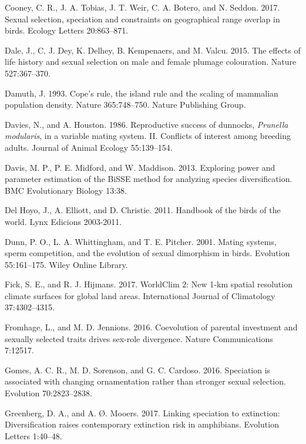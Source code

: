 \documentclass[]{article}
\begin{document}
\leavevmode\hypertarget{ref-Cooney_2017}{}%
Cooney, C. R., J. A. Tobias, J. T. Weir, C. A. Botero, and N. Seddon.
2017. Sexual selection, speciation and constraints on geographical range
overlap in birds. Ecology Letters 20:863--871.

\leavevmode\hypertarget{ref-Dale_2015}{}%
Dale, J., C. J. Dey, K. Delhey, B. Kempenaers, and M. Valcu. 2015. The
effects of life history and sexual selection on male and female plumage
colouration. Nature 527:367--370.

\leavevmode\hypertarget{ref-Damuth_1993}{}%
Damuth, J. 1993. Cope's rule, the island rule and the scaling of
mammalian population density. Nature 365:748--750. Nature Publishing
Group.

\leavevmode\hypertarget{ref-davies1986re}{}%
Davies, N., and A. Houston. 1986. Reproductive success of dunnocks,
\emph{Prunella modularis}, in a variable mating system. II. Conflicts of
interest among breeding adults. Journal of Animal Ecology 55:139--154.

\leavevmode\hypertarget{ref-Davis_2013}{}%
Davis, M. P., P. E. Midford, and W. Maddison. 2013. Exploring power and
parameter estimation of the BiSSE method for analyzing species
diversification. BMC Evolutionary Biology 13:38.

\leavevmode\hypertarget{ref-delhoyo2011}{}%
Del Hoyo, J., A. Elliott, and D. Christie. 2011. Handbook of the birds
of the world. Lynx Edicions 2003-2011.

\leavevmode\hypertarget{ref-dunn_2001}{}%
Dunn, P. O., L. A. Whittingham, and T. E. Pitcher. 2001. Mating systems,
sperm competition, and the evolution of sexual dimorphism in birds.
Evolution 55:161--175. Wiley Online Library.

\leavevmode\hypertarget{ref-Fick_2017}{}%
Fick, S. E., and R. J. Hijmans. 2017. WorldClim 2: New 1-km spatial
resolution climate surfaces for global land areas. International Journal
of Climatology 37:4302--4315.

\leavevmode\hypertarget{ref-Fromhage_2016}{}%
Fromhage, L., and M. D. Jennions. 2016. Coevolution of parental
investment and sexually selected traits drives sex-role divergence.
Nature Communications 7:12517.

\leavevmode\hypertarget{ref-Gomes_2016}{}%
Gomes, A. C. R., M. D. Sorenson, and G. C. Cardoso. 2016. Speciation is
associated with changing ornamentation rather than stronger sexual
selection. Evolution 70:2823--2838.

\leavevmode\hypertarget{ref-Greenberg_2017}{}%
Greenberg, D. A., and A. Ø. Mooers. 2017. Linking speciation to
extinction: Diversification raises contemporary extinction risk in
amphibians. Evolution Letters 1:40--48.
\end{document}
